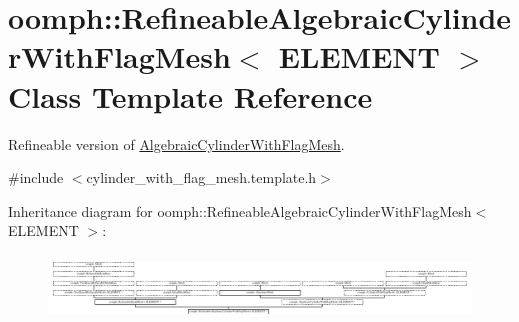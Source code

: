 \hypertarget{classoomph_1_1RefineableAlgebraicCylinderWithFlagMesh}{}\section{oomph\+:\+:Refineable\+Algebraic\+Cylinder\+With\+Flag\+Mesh$<$ E\+L\+E\+M\+E\+NT $>$ Class Template Reference}
\label{classoomph_1_1RefineableAlgebraicCylinderWithFlagMesh}


Refineable version of \hyperlink{classoomph_1_1AlgebraicCylinderWithFlagMesh}{Algebraic\+Cylinder\+With\+Flag\+Mesh}.  




{\ttfamily \#include $<$cylinder\+\_\+with\+\_\+flag\+\_\+mesh.\+template.\+h$>$}

Inheritance diagram for oomph\+:\+:Refineable\+Algebraic\+Cylinder\+With\+Flag\+Mesh$<$ E\+L\+E\+M\+E\+NT $>$\+:\begin{figure}[H]
\begin{center}
\leavevmode
\includegraphics[height=1.731959cm]{classoomph_1_1RefineableAlgebraicCylinderWithFlagMesh}
\end{center}
\end{figure}
